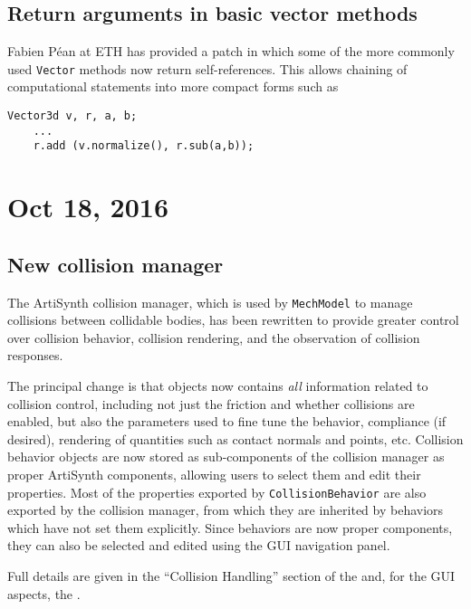 \documentclass{article}
\begin{document}
\subsection*{Return arguments in basic vector methods}

Fabien P\'{e}an at ETH has provided a patch in which some of the more
commonly used {\tt Vector} methods now return self-references.  This
allows chaining of computational statements into more compact forms
such as

%
\begin{lstlisting}[]
    Vector3d v, r, a, b;
    ...
    r.add (v.normalize(), r.sub(a,b));
\end{lstlisting}
%

\section*{Oct 18, 2016}

\subsection*{New collision manager}

The ArtiSynth collision manager, which is used by {\tt MechModel} to
manage collisions between collidable bodies, has been rewritten to
provide greater control over collision behavior, collision rendering,
and the observation of collision responses. 

The principal change is that
 objects now
contains {\it all} information related to collision control, including
not just the friction and whether collisions are enabled, but also the
parameters used to fine tune the behavior, compliance (if desired),
rendering of quantities such as contact normals and points,
etc. Collision behavior objects are now stored as sub-components of
the collision manager as proper ArtiSynth components, allowing users
to select them and edit their properties. Most of the properties
exported by {\tt CollisionBehavior} are also exported by the collision
manager, from which they are inherited by behaviors which have not set
them explicitly. Since behaviors are now proper components, they can
also be selected and edited using the GUI navigation panel.

Full details are given in the ``Collision Handling'' section of the
and, for the GUI aspects, the
.
\end{document}
